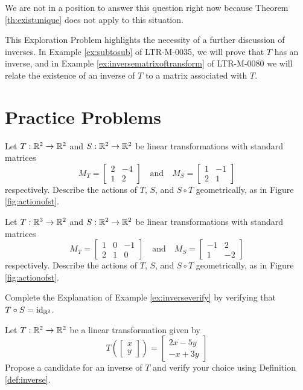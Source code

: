 \documentclass{ximera}
\begin{document}
\begin{initprob}
We are not in a position to answer this question right now because Theorem \ref{th:existunique} does not apply to this situation. 
\end{initprob}
This Exploration Problem highlights the necessity of a further discussion of inverses.  In Example \ref{ex:subtosub} of LTR-M-0035, we will prove that $T$ has an inverse, and in Example \ref{ex:inversematrixoftransform} of LTR-M-0080 we will relate the existence of an inverse of $T$ to a matrix associated with $T$.


\section*{Practice Problems}
\begin{problem}
Let $T:\mathbb{R}^2\rightarrow \mathbb{R}^2$ and $S:\mathbb{R}^2\rightarrow \mathbb{R}^2$ be linear transformations with standard matrices 
$$M_T=\begin{bmatrix}2&-4\\1&2\end{bmatrix}\quad\text{and}\quad M_S=\begin{bmatrix}1&-1\\2&1\end{bmatrix}$$
respectively.  Describe the actions of $T$, $S$, and $S\circ T$ geometrically, as in Figure \ref{fig:actionofst}.
\end{problem}
\begin{problem}
Let $T:\mathbb{R}^3\rightarrow \mathbb{R}^2$ and $S:\mathbb{R}^2\rightarrow \mathbb{R}^2$ be linear transformations with standard matrices 
$$M_T=\begin{bmatrix}1&0&-1\\2&1&0\end{bmatrix}\quad\text{and}\quad M_S=\begin{bmatrix}-1&2\\1&-2\end{bmatrix}$$
respectively.  Describe the actions of $T$, $S$, and $S\circ T$ geometrically, as in Figure \ref{fig:actionofst}.
\end{problem}
\begin{problem}
Complete the Explanation of Example \ref{ex:inverseverify} by verifying that $T\circ S=\text{id}_{\mathbb{R}^2}$.
\end{problem}
\begin{problem}
Let $T:\mathbb{R}^2\rightarrow \mathbb{R}^2$ be a linear transformation given by 
$$T\left(\begin{bmatrix}x\\y\end{bmatrix}\right)=\begin{bmatrix}2x-5y\\-x+3y\end{bmatrix}$$
Propose a candidate for an inverse of $T$ and verify your choice using Definition \ref{def:inverse}.
\end{problem}
\end{document}
